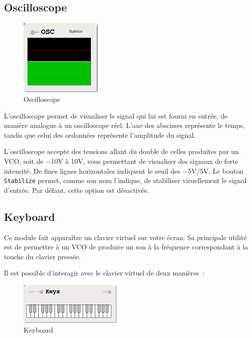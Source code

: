 \documentclass[a4paper,oneside,frenchb,10pt]{article}
\begin{document}
\subsection{Oscilloscope}

\begin{multicols}{2}
\begin{figure}[H]
\centering
\includegraphics[width=4cm]{../img/png/oscilloscope.png}
\caption{Oscilloscope}
\end{figure}

L'oscilloscope permet de visualiser le signal qui lui est fourni en
entrée, de manière analogue à un oscilloscope réel. L'axe des abscisses
représente le temps, tandis que celui des ordonnées représente
l'amplitude du signal.

L'oscilloscope accepte des tensions allant du double de celles produites
par un VCO, soit de −10V à 10V, vous permettant de visualiser des
signaux de forte intensité. De fines lignes horizontales indiquent le seuil
des $-$5V/5V. Le bouton \verb!Stabilize! permet, comme son nom l'indique, de
stabiliser visuellement le signal d'entrée. Par défaut, cette option est
désactivée.
\end{multicols}

\subsection{Keyboard}

\begin{multicols}{2}
Ce module fait apparaître un clavier virtuel sur votre écran. Sa
principale utilité est de permettre à un VCO de produire un son à la
fréquence correspondant à la touche du clavier pressée.

Il est possible d'interagir avec le clavier virtuel de deux manières~:

\begin{figure}[H]
\centering
\includegraphics[width=5cm]{../img/png/keyboard.png}
\caption{Keyboard}
\end{figure}
\end{multicols}
\end{document}
